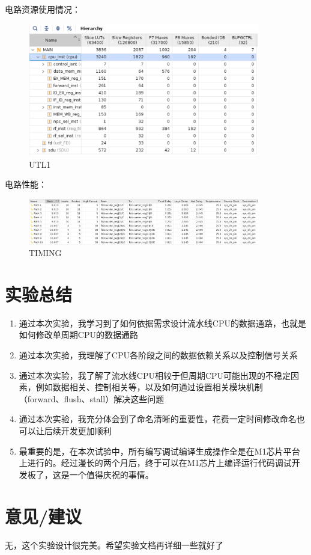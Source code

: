 \documentclass[a4paper]{article}
\begin{document}
电路资源使用情况：
\begin{figure}[H]
    \centering
    \includegraphics[width=0.9\textwidth]{4.png}
    \caption{UTL1}
    \label{fig:test1}
\end{figure}


电路性能：
\begin{figure}[H]
    \centering
    \includegraphics[width=0.9\textwidth]{3.png}
    \caption{TIMING}
    \label{fig:test1}
\end{figure}

\section {实验总结}
\begin{enumerate}
  \item 通过本次实验，我学习到了如何依据需求设计流水线CPU的数据通路，也就是如何修改单周期CPU的数据通路
  \item 通过本次实验，我理解了CPU各阶段之间的数据依赖关系以及控制信号关系
  \item 通过本次实验，我了解了流水线CPU相较于但周期CPU可能出现的不稳定因素，例如数据相关、控制相关等，以及如何通过设置相关模块机制（forward、flush、stall）解决这些问题
  \item 通过本次实验，我充分体会到了命名清晰的重要性，花费一定时间修改命名也可以让后续开发更加顺利
  \item 最重要的是，在本次试验中，所有编写调试编译生成操作全是在M1芯片平台上进行的。经过漫长的两个月后，终于可以在M1芯片上编译运行代码调试开发板了，这是一个值得庆祝的事情。
\end{enumerate}
\section {意见/建议}
无，这个实验设计很完美。希望实验文档再详细一些就好了
\end{document}
